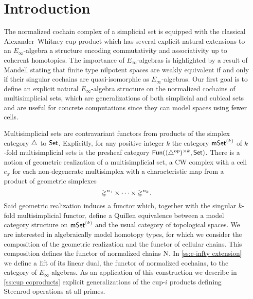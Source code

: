 

\section{Introduction} \label{s:introduction}

The normalized cochain complex of a simplicial set is equipped with the classical Alexander--Whitney cup product which has several explicit natural extensions to an $E_\infty$-algebra \cite{mcclure2003multivariable, berger2004combinatorial, medina2020prop1} a structure encoding commutativity and associativity up to coherent homotopies.
The importance of $E_\infty$-algebras is highlighted by a result of Mandell \cite{mandell2006homotopy_type} stating that finite type nilpotent spaces are weakly equivalent if and only if their singular cochains are quasi-isomorphic as $E_\infty$-algebras.
Our first goal is to define an explicit natural $E_\infty$-algebra structure on the normalized cochains of multisimplicial sets, which are generalizations of both simplicial and cubical sets and are useful for concrete computations since they can model spaces using fewer cells.

Multisimplicial sets are contravariant functors from products of the simplex category $\triangle$ to $\mathsf{Set}$.
Explicitly, for any positive integer $k$ the category $\mathsf{mSet}^{(k)}$ of $k$-fold multisimplicial sets is the presheaf category $\mathsf{Fun}((\triangle^{\mathrm{op}})^{\times k}, \mathsf{Set})$.
There is a notion of geometric realization of a multisimplicial set, a CW complex with a cell $e_x$ for each non-degenerate multisimplex with a characteristic map from a product of geometric simplexes
\[
\mathbb{\Delta}^{n_1}\times\dots\times\mathbb{\Delta}^{n_k}.
\]
Said geometric realization induces a functor which, together with the singular $k$-fold multisimplicial functor, define a Quillen equivalence between a model category structure on $\mathsf{mSet}^{(k)}$ and the usual category of topological spaces.
We are interested in algebraically model homotopy types, for which we consider the composition of the geometric realization and the functor of cellular chains.
This composition defines the functor of normalized chains $\operatorname{N}$.
In \cref{ss:e-infty extension} we define a lift of its linear dual, the functor of normalized cochains, to the category of $E_\infty$-algebras.
As an application of this construction we describe in \cref{ss:cup coproducts} explicit generalizations of the cup-$i$ products defining Steenrod operations at all primes.

